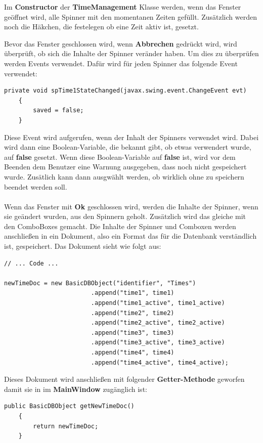 \vspace{10pt}

Im \textbf{Constructor} der \textbf{TimeManagement} Klasse werden, wenn das Fenster geöffnet wird, alle Spinner mit den momentanen Zeiten gefüllt. Zusätzlich werden noch die Häkchen, die festelegen ob eine Zeit aktiv ist, gesetzt.

\vspace{10pt}

Bevor das Fenster geschlossen wird, wenn \textbf{Abbrechen} gedrückt wird, wird überprüft, ob sich die Inhalte der Spinner veränder haben. Um dies zu überprüfen werden Events verwendet. Dafür wird für jeden Spinner das folgende Event verwendet:
\begin{lstlisting}[style=JavaStyle, caption=Spinner Event]
    private void spTime1StateChanged(javax.swing.event.ChangeEvent evt)                                     
    {                                         
        saved = false;
    }   
\end{lstlisting} 
Diese Event wird aufgerufen, wenn der Inhalt der Spinners verwendet wird. Dabei wird dann eine Boolean-Variable, die bekannt gibt, ob etwas verwendert wurde, auf \textbf{false} gesetzt. Wenn diese Boolean-Variable auf \textbf{false} ist, wird vor dem Beenden dem Benutzer eine Warnung ausgegeben, dass noch nicht gespeichert wurde. Zusätlich kann dann ausgwählt werden, ob wirklich ohne zu speichern beendet werden soll.
\\ \\ Wenn das Fenster mit \textbf{Ok} geschlossen wird, werden die Inhalte der Spinner, wenn sie geändert wurden, aus den Spinnern geholt. Zusätzlich wird das gleiche mit den ComboBoxes gemacht. Die Inhalte der Spinner und Comboxen werden anschließen in ein Dokument, also ein Format das für die Datenbank verständlich ist, gespeichert. Das Dokument sieht wie folgt aus:
\begin{lstlisting}[style=Javastyle, caption=Zeitendokument Getter-Methode]
// ... Code ...

newTimeDoc = new BasicDBObject("identifier", "Times")
                        .append("time1", time1)
                        .append("time1_active", time1_active)
                        .append("time2", time2)
                        .append("time2_active", time2_active)
                        .append("time3", time3)
                        .append("time3_active", time3_active)
                        .append("time4", time4)
                        .append("time4_active", time4_active);
\end{lstlisting}
Dieses Dokument wird anschließen mit folgender \textbf{Getter-Methode} geworfen damit sie in im \textbf{MainWindow} zugänglich ist:
\begin{lstlisting}[style=Javastyle, caption=Zeitendokument]
public BasicDBObject getNewTimeDoc()
    {
        return newTimeDoc;
    }
\end{lstlisting}

